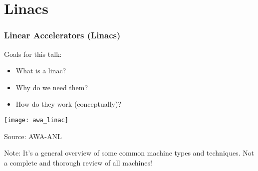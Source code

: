 \documentclass[professionalfonts,t]{beamer}
\begin{document}


\section{Linacs}

\begin{frame}
	\frametitle{Linear Accelerators (Linacs)}
	
	\vspace{1em}
	
	\begin{minipage}{0.43\textwidth}
		Goals for this talk:
		
		\begin{itemize}
			\item What is a linac?
			\item Why do we need them?
			\item How do they work (conceptually)?
		\end{itemize}
	\end{minipage}
\begin{minipage}{0.55\textwidth}
	\centering
	\texttt{[image: awa\_linac]}
	
	Source: AWA-ANL 
\end{minipage}

\vspace{1em}
Note: It's a general overview of some common machine types and techniques.
Not a complete and thorough review of all machines!

\end{frame}
\end{document}
